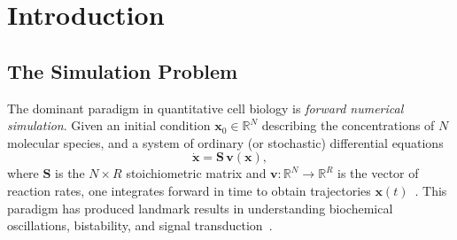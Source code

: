 \documentclass[twocolumn,10pt,a4paper]{article}
\begin{document}
\begin{abstract}
We prove that the MAP backward trajectory of any node is \emph{time-invariant}
for autonomous kinetics: it depends on the current state and network topology
but not on the absolute time at which observation occurs.  This trajectory is
therefore a \emph{categorical address}---a fixed geometric identity of the node
within the network's state space.  Categorical state information propagates
through the network at signal velocity $v_s \sim \sqrt{\kappa/m_{\mathrm{eff}}}$,
exceeding Fickian drift by three to six orders of magnitude, rendering the
network informationally well-mixed on timescales shorter than any metabolic
reaction.  Applications to cell-state instantiation from partial omics data,
disease detection via trajectory escape from the healthy attractor basin, and
rational drug design as targeted edge-conductance modification are developed in
detail.  The framework unifies flux balance analysis, metabolic control
analysis, and stochastic kinetics within a single information-geometric picture.
\end{abstract}

\section{Introduction}
\label{sec:intro}

\subsection{The Simulation Problem}
\label{sec:intro-sim}

The dominant paradigm in quantitative cell biology is \emph{forward numerical
simulation}.  Given an initial condition $\mathbf{x}_0\in\mathbb{R}^N$
describing the concentrations of $N$ molecular species, and a system of
ordinary (or stochastic) differential equations
\begin{equation}
  \dot{\mathbf{x}} = \mathbf{S}\,\mathbf{v}(\mathbf{x}),
  \label{eq:ode}
\end{equation}
where $\mathbf{S}$ is the $N\times R$ stoichiometric matrix and
$\mathbf{v}:\mathbb{R}^N\to\mathbb{R}^R$ is the vector of reaction rates, one
integrates forward in time to obtain trajectories
$\mathbf{x}(t)$~\cite{Murray2002,Klipp2005}.  This paradigm has produced
landmark results in understanding biochemical oscillations, bistability, and
signal transduction~\cite{Tyson2003,Strogatz1994}.
\end{document}
